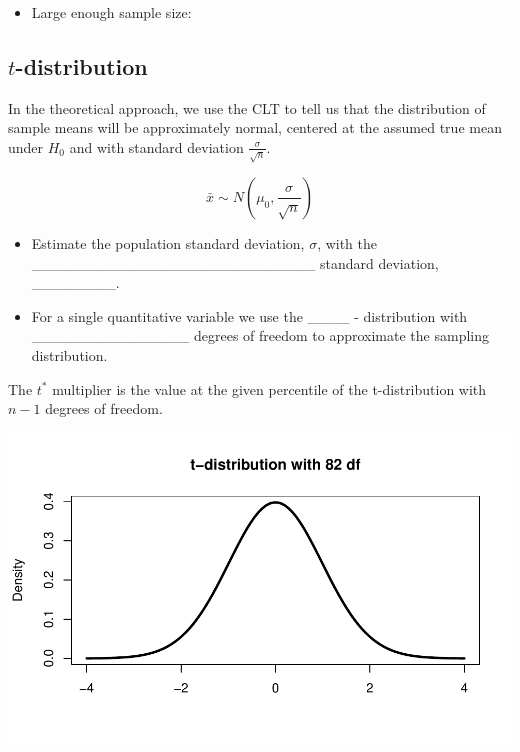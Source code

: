 \documentclass[
]{report}
\providecommand{\tightlist}{%
  \setlength{\itemsep}{0pt}\setlength{\parskip}{0pt}}
\begin{document}
\vspace{0.2in}

\begin{itemize}
\tightlist
\item
  Large enough sample size:
\end{itemize}

\vspace{0.2in}

\subsection*{\texorpdfstring{\(t\)-distribution}{t-distribution}}\label{t-distribution-1}

In the theoretical approach, we use the CLT to tell us that the distribution of sample means will be approximately normal, centered at the assumed true mean under \(H_0\) and with standard deviation \(\frac{\sigma}{\sqrt{n}}\).

\[\bar{x} \sim N\left(\mu_0, \frac{\sigma}{\sqrt{n}}\right)\]

\begin{itemize}
\item
  Estimate the population standard deviation, \(\sigma\), with the
  \_\_\_\_\_\_\_\_\_\_\_\_\_\_\_\_\_\_\_\_\_\_\_\_\_\_\_ standard deviation, \_\_\_\_\_\_\_\_.
\item
  For a single quantitative variable we use the \_\_\_\_ - distribution
  with \_\_\_\_\_\_\_\_\_\_\_\_\_\_\_
  degrees of freedom to approximate the sampling distribution.
\end{itemize}


The \(t^*\) multiplier is the value at the given percentile of the t-distribution with \(n - 1\) degrees of freedom.

\begin{center}\includegraphics[width=0.7\linewidth]{07-VN07-one_meantheory_files/figure-latex/tstarpb-1} \end{center}
\end{document}
